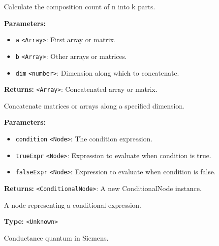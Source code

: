 \documentclass[12pt,a4paper]{article}
\begin{document}
\noindent Calculate the composition count of n into k parts.

\vspace{5mm}
\noindent {}


\noindent \textbf{Parameters:}
\begin{itemize}
  \item \texttt{a} \texttt{<Array>}: First array or matrix.
  \item \texttt{b} \texttt{<Array>}: Other arrays or matrices.
  \item \texttt{dim} \texttt{<number>}: Dimension along which to concatenate.
\end{itemize}

\noindent \textbf{Returns:} \texttt{<Array>}: Concatenated array or matrix.

\noindent Concatenate matrices or arrays along a specified dimension.

\vspace{5mm}
\noindent {}


\noindent \textbf{Parameters:}
\begin{itemize}
  \item \texttt{condition} \texttt{<Node>}: The condition expression.
  \item \texttt{trueExpr} \texttt{<Node>}: Expression to evaluate when condition is true.
  \item \texttt{falseExpr} \texttt{<Node>}: Expression to evaluate when condition is false.
\end{itemize}

\noindent \textbf{Returns:} \texttt{<ConditionalNode>}: A new ConditionalNode instance.

\noindent A node representing a conditional expression.

\vspace{5mm}
\noindent {}\vspace{4mm}


\noindent \textbf{Type:} \texttt{<Unknown>}

\noindent Conductance quantum in Siemens.
\end{document}
